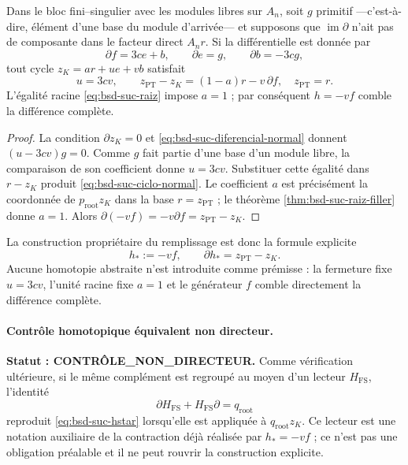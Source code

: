 \begin{lemma}
\label{lem:bsd-suc-forma-normal}
Dans le bloc fini--singulier avec
les modules libres sur \(A_n\), soit \(g\) primitif ---c'est-à-dire, élément d'une
base du module d'arrivée--- et supposons que
\(\operatorname{im}\partial\) n'ait pas de composante dans le facteur direct
\(A_n r\). Si la différentielle est donnée par
\begin{equation}\label{eq:bsd-suc-diferencial-normal}
 \partial f=3c e+b,
 \qquad \partial e=g,
 \qquad \partial b=-3c g,
\end{equation}
tout cycle \(z_K=a r+u e+v b\) satisfait
\begin{equation}\label{eq:bsd-suc-ciclo-normal}
 u=3cv,
 \qquad
 z_{\mathrm{PT}}-z_K=(1-a)r-v\,\partial f,
 \quad z_{\mathrm{PT}}=r.
\end{equation}
L'égalité racine \eqref{eq:bsd-suc-raiz} impose \(a=1\) ; par conséquent
\(h=-vf\) comble la différence complète.
\end{lemma}

\begin{proof}
La condition \(\partial z_K=0\) et
\eqref{eq:bsd-suc-diferencial-normal} donnent
\((u-3cv)g=0\). Comme \(g\) fait partie d'une base d'un module libre,
la comparaison de son coefficient donne \(u=3cv\). Substituer cette égalité dans
\(r-z_K\) produit \eqref{eq:bsd-suc-ciclo-normal}. Le coefficient \(a\)
est précisément la coordonnée de \(p_{\mathrm{root}}z_K\) dans la base
\(r=z_{\mathrm{PT}}\) ; le théorème \ref{thm:bsd-suc-raiz-filler} donne
\(a=1\). Alors
\(\partial(-vf)=-v\partial f=z_{\mathrm{PT}}-z_K\).
\end{proof}

La construction propriétaire du remplissage est donc la formule explicite
\begin{equation}\label{eq:bsd-suc-hstar}
 h_*:=-vf,
 \qquad
 \partial h_*=z_{\mathrm{PT}}-z_K.
\end{equation}
Aucune homotopie abstraite n'est introduite comme prémisse : la fermeture fixe
\(u=3cv\), l'unité racine fixe \(a=1\) et le générateur \(f\) comble
directement la différence complète.

\paragraph{Contrôle homotopique équivalent non directeur.}
\noindent\textbf{Statut : CONTRÔLE\_NON\_DIRECTEUR.}
Comme vérification ultérieure, si le même complément est regroupé au moyen
d'un lecteur \(H_{\mathrm{FS}}\), l'identité
\begin{equation}\label{eq:bsd-suc-hfs}
 \partial H_{\mathrm{FS}}+H_{\mathrm{FS}}\partial
 =q_{\mathrm{root}}
\end{equation}
reproduit \eqref{eq:bsd-suc-hstar} lorsqu'elle est appliquée à
\(q_{\mathrm{root}}z_K\). Ce lecteur est une notation auxiliaire de la
contraction déjà réalisée par \(h_*=-vf\) ; ce n'est pas une obligation préalable et il ne
peut rouvrir la construction explicite.

